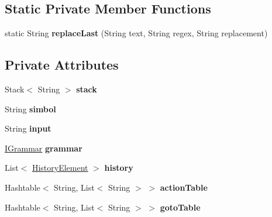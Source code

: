 \subsection*{Static Private Member Functions}
\begin{DoxyCompactItemize}
\item 
\hypertarget{classparser_program_1_1_parser_program_ad3661a982707613bf19207e8a8dea111}{static String {\bfseries replace\-Last} (String text, String regex, String replacement)}\label{classparser_program_1_1_parser_program_ad3661a982707613bf19207e8a8dea111}

\end{DoxyCompactItemize}
\subsection*{Private Attributes}
\begin{DoxyCompactItemize}
\item 
\hypertarget{classparser_program_1_1_parser_program_a2058f2a99c2704e6dd31bb9c0b19c085}{Stack$<$ String $>$ {\bfseries stack}}\label{classparser_program_1_1_parser_program_a2058f2a99c2704e6dd31bb9c0b19c085}

\item 
\hypertarget{classparser_program_1_1_parser_program_a2ab3901075f4c939b8f81eeb396eabed}{String {\bfseries simbol}}\label{classparser_program_1_1_parser_program_a2ab3901075f4c939b8f81eeb396eabed}

\item 
\hypertarget{classparser_program_1_1_parser_program_a316d94b7fa9f2299a0afc1bfd8eff026}{String {\bfseries input}}\label{classparser_program_1_1_parser_program_a316d94b7fa9f2299a0afc1bfd8eff026}

\item 
\hypertarget{classparser_program_1_1_parser_program_a4254fc1216b4026ee88821603ad218d3}{\hyperlink{interfacecontext_free_1_1grammar_1_1_i_grammar}{I\-Grammar} {\bfseries grammar}}\label{classparser_program_1_1_parser_program_a4254fc1216b4026ee88821603ad218d3}

\item 
\hypertarget{classparser_program_1_1_parser_program_af067e8fa30e30d425f2177c512fa4248}{List$<$ \hyperlink{classparser_program_1_1_history_element}{History\-Element} $>$ {\bfseries history}}\label{classparser_program_1_1_parser_program_af067e8fa30e30d425f2177c512fa4248}

\item 
\hypertarget{classparser_program_1_1_parser_program_a2dec179401edcc43f84d128188180593}{Hashtable$<$ String, List$<$ String $>$ $>$ {\bfseries action\-Table}}\label{classparser_program_1_1_parser_program_a2dec179401edcc43f84d128188180593}

\item 
\hypertarget{classparser_program_1_1_parser_program_aebaaa2fbe8f4324d697192b8c976c60e}{Hashtable$<$ String, List$<$ String $>$ $>$ {\bfseries goto\-Table}}\label{classparser_program_1_1_parser_program_aebaaa2fbe8f4324d697192b8c976c60e}

\end{DoxyCompactItemize}


